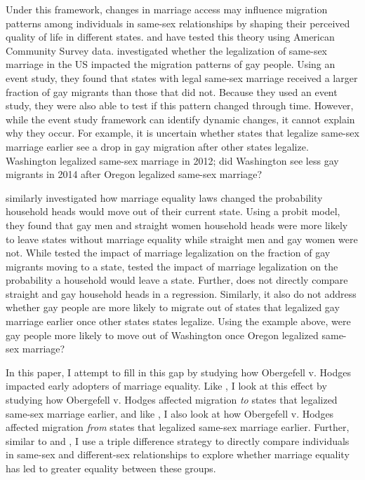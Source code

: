 \documentclass[12pt,letterpaper]{article}
\begin{document}
Under this framework, changes in marriage access may influence migration patterns among individuals in same-sex relationships by shaping their perceived quality of life in different states. \citet{1} and \citet{12} have tested this theory using American Community Survey data. \citet{1} investigated whether the legalization of same-sex marriage in the US impacted the migration patterns of gay people. Using an event study, they found that states with legal same-sex marriage received a larger fraction of gay migrants than those that did not. Because they used an event study, they were also able to test if this pattern changed through time. However, while the event study framework can identify dynamic changes, it cannot explain why they occur. For example, it is uncertain whether states that legalize same-sex marriage earlier see a drop in gay migration after other states legalize. Washington legalized same-sex marriage in 2012; did Washington see less gay migrants in 2014 after Oregon legalized same-sex marriage? 

\citet{12} similarly investigated how marriage equality laws changed the probability household heads would move out of their current state. Using a probit model, they found that gay men and straight women household heads were more likely to leave states without marriage equality while straight men and gay women were not. While \citet{1} tested the impact of marriage legalization on the fraction of gay migrants moving to a state, \citet{12} tested the impact of marriage legalization on the probability a household would leave a state. Further, \citet{12} does not directly compare straight and gay household heads in a regression. Similarly, it also do not address whether gay people are more likely to migrate out of states that legalized gay marriage earlier once other states states legalize. Using the example above, were gay people more likely to move out of Washington once Oregon legalized same-sex marriage?

In this paper, I attempt to fill in this gap by studying how Obergefell v. Hodges impacted early adopters of marriage equality. Like \citet{1}, I look at this effect by studying how Obergefell v. Hodges affected migration \textit{to} states that legalized same-sex marriage earlier, and like \citet{12}, I also look at how Obergefell v. Hodges affected migration \textit{from} states that legalized same-sex marriage earlier. Further, similar to \citet{3} and \citet{30}, I use a triple difference strategy to directly compare individuals in same-sex and different-sex relationships to explore whether marriage equality has led to greater equality between these groups.
\end{document}
